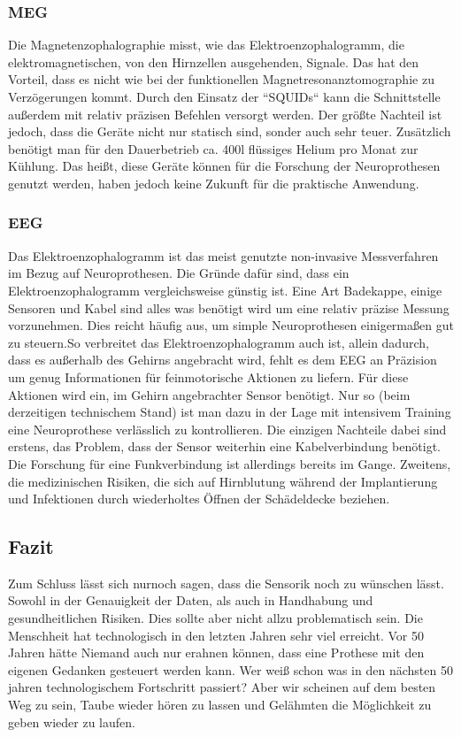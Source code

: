 \documentclass[11pt,ngerman,parskip=half]{scrartcl}
\begin{document}
\subsubsection{MEG}
Die Magnetenzophalographie misst, wie das Elektroenzophalogramm, die elektromagnetischen, von den Hirnzellen ausgehenden, Signale. Das hat den Vorteil, dass es nicht wie bei der funktionellen Magnetresonanztomographie zu Verzögerungen kommt.  Durch den Einsatz der “SQUIDs“ kann die Schnittstelle außerdem mit relativ präzisen Befehlen versorgt werden. Der größte Nachteil ist jedoch, dass die Geräte nicht nur statisch sind, sonder auch sehr teuer. Zusätzlich benötigt man für den Dauerbetrieb ca. 400l flüssiges Helium pro Monat zur Kühlung. Das heißt, diese Geräte können für die Forschung der Neuroprothesen genutzt werden, haben jedoch keine Zukunft für die praktische Anwendung.
\subsubsection{EEG} Das Elektroenzophalogramm ist das meist genutzte non-invasive Messverfahren im Bezug auf Neuroprothesen. Die Gründe dafür sind, dass ein Elektroenzophalogramm vergleichsweise günstig ist. Eine Art Badekappe, einige Sensoren und Kabel sind alles was benötigt wird um eine relativ präzise Messung vorzunehmen. Dies reicht häufig aus, um simple Neuroprothesen einigermaßen gut zu steuern.So verbreitet das Elektroenzophalogramm auch ist, allein dadurch, dass es außerhalb des Gehirns angebracht wird, fehlt es dem EEG an Präzision um genug Informationen für feinmotorische Aktionen zu liefern. Für diese Aktionen wird ein, im Gehirn angebrachter Sensor benötigt. Nur so (beim derzeitigen technischem Stand) ist man dazu in der Lage mit intensivem Training eine Neuroprothese verlässlich zu kontrollieren. Die einzigen Nachteile dabei sind erstens, das Problem, dass der Sensor weiterhin eine Kabelverbindung benötigt. Die Forschung für eine Funkverbindung ist allerdings bereits im Gange. Zweitens, die medizinischen Risiken, die sich auf Hirnblutung während der Implantierung und Infektionen durch wiederholtes Öffnen der Schädeldecke beziehen.
\subsection{Fazit}
Zum Schluss lässt sich nurnoch sagen, dass die Sensorik noch zu wünschen lässt. Sowohl in der Genauigkeit der Daten, als auch in Handhabung und gesundheitlichen Risiken. Dies sollte aber nicht allzu problematisch sein. Die Menschheit hat technologisch in den letzten Jahren sehr viel erreicht. Vor 50 Jahren hätte Niemand auch nur erahnen können, dass eine Prothese mit den eigenen Gedanken gesteuert werden kann. Wer weiß schon was in den nächsten 50 jahren technologischem Fortschritt passiert? Aber wir scheinen auf dem besten Weg zu sein, Taube wieder hören zu lassen und Gelähmten die Möglichkeit zu geben wieder zu laufen.\parencite{eeg ,fmrt, meg, bciuinvasiv}
\end{document}
